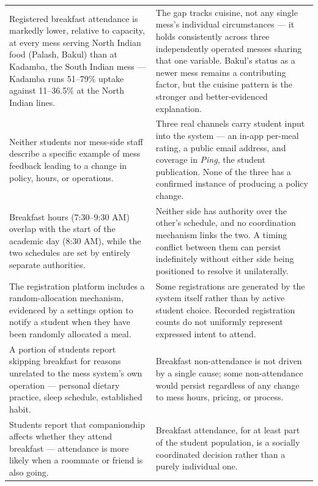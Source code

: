 \documentclass[11pt]{article}
\begin{document}
\begin{longtable}{L{0.45\textwidth}L{0.45\textwidth}}
Registered breakfast attendance is markedly lower, relative to capacity, at every
mess serving North Indian food (Palash, Bakul) than at Kadamba, the South Indian mess
--- Kadamba runs 51--79\% uptake against 11--36.5\% at the North Indian lines. &
The gap tracks cuisine, not any single mess's individual circumstances --- it holds
consistently across three independently operated messes sharing that one variable.
Bakul's status as a newer mess remains a contributing factor, but the cuisine
pattern is the stronger and better-evidenced explanation. \\[6pt]

Neither students nor mess-side staff describe a specific example of mess feedback
leading to a change in policy, hours, or operations. &
Three real channels carry student input into the system --- an in-app per-meal
rating, a public email address, and coverage in \emph{Ping}, the student publication.
None of the three has a confirmed instance of producing a policy change. \\[6pt]

Breakfast hours (7:30--9:30 AM) overlap with the start of the academic day (8:30 AM),
while the two schedules are set by entirely separate authorities. &
Neither side has authority over the other's schedule, and no coordination mechanism
links the two. A timing conflict between them can persist indefinitely without either
side being positioned to resolve it unilaterally. \\[6pt]

The registration platform includes a random-allocation mechanism, evidenced by a
settings option to notify a student when they have been randomly allocated a meal. &
Some registrations are generated by the system itself rather than by active student
choice. Recorded registration counts do not uniformly represent expressed intent to
attend. \\[6pt]

A portion of students report skipping breakfast for reasons unrelated to the mess
system's own operation --- personal dietary practice, sleep schedule, established
habit. &
Breakfast non-attendance is not driven by a single cause; some non-attendance would
persist regardless of any change to mess hours, pricing, or process. \\[6pt]

Students report that companionship affects whether they attend breakfast ---
attendance is more likely when a roommate or friend is also going. &
Breakfast attendance, for at least part of the student population, is a socially
coordinated decision rather than a purely individual one. \\
\bottomrule
\end{longtable}
\end{document}
